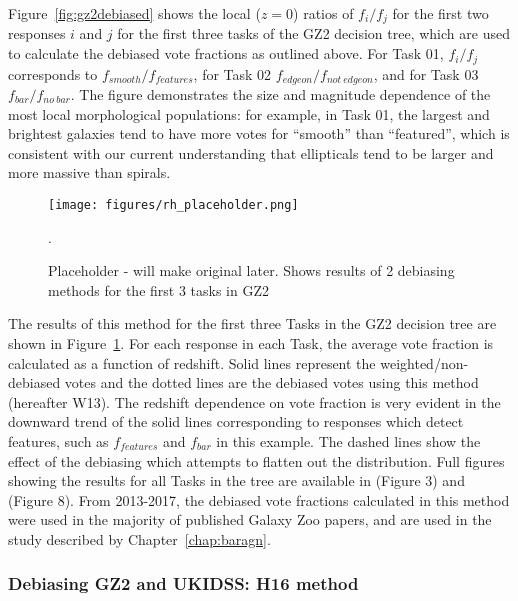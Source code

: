 Figure~\ref{fig:gz2debiased} shows the local ($z=0$) ratios of $f_i/f_j$ for the first two responses $i$ and $j$ for the first three tasks of the GZ2 decision tree, which are used to calculate the debiased vote fractions as outlined above. For Task 01, $f_i/f_j$ corresponds to $f_{smooth}/f_{features}$, for Task 02 $f_{edgeon}/f_{not~edgeon}$, and for Task 03 $f_{bar}/f_{no~bar}.$ The figure demonstrates the size and magnitude dependence of the most local morphological populations: for example, in Task 01, the largest and brightest galaxies tend to have more votes for ``smooth'' than ``featured'', which is consistent with our current understanding that ellipticals tend to be larger and more massive than spirals. 


\begin{figure}
\centering
\texttt{[image: figures/rh\_placeholder.png]}
\caption{Placeholder - will make original later. Shows results of 2 debiasing methods for the first 3 tasks in GZ2}. 
\label{fig:gz2debiasingresults}
\end{figure}

The results of this method for the first three Tasks in the GZ2 decision tree are shown in Figure~\ref{fig:gz2debiasingresults}. For each response in each Task, the average vote fraction is calculated as a function of redshift. Solid lines represent the weighted/non-debiased votes and the dotted lines are the debiased votes using this method (hereafter W13).
The redshift dependence on vote fraction is very evident in the downward trend of the solid lines corresponding to responses which detect features, such as $f_{features}$ and $f_{bar}$ in this example. The dashed lines show the effect of the debiasing which attempts to flatten out the distribution. Full figures showing the results for all Tasks in the tree are available in \citet{Willett2013} (Figure 3) and \citet{Hart2016} (Figure 8). From 2013-2017, the debiased vote fractions calculated in this method were used in the majority of published Galaxy Zoo papers, and are used in the study described by Chapter~\ref{chap:baragn}. 


\subsubsection{Debiasing GZ2 and UKIDSS: H16 method}

